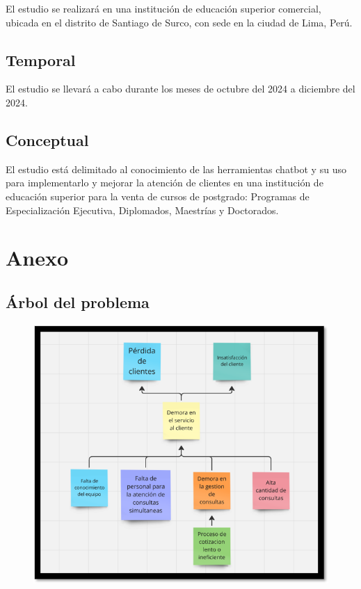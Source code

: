 \documentclass[10pt,a4paper]{article}
\begin{document}
	El estudio se realizará en una institución de educación superior comercial, ubicada en el distrito de Santiago de Surco, con sede en la ciudad de Lima, Perú.

 

    \subsection{Temporal}
	El estudio se llevará a cabo durante los meses de octubre del 2024 a diciembre del 2024.

  

    \subsection{Conceptual}
	El estudio está delimitado al conocimiento de las herramientas chatbot y su uso para implementarlo y mejorar la atención de clientes en una institución de educación superior para la venta de cursos de postgrado: Programas de Especialización Ejecutiva, Diplomados, Maestrías y Doctorados. 

	\section{Anexo}
		    
	\subsection{Árbol del problema}

	\begin{figure}[H]
		\includegraphics[scale=1]{ArbolProblema.png} \hfill 
	\end{figure}
 
\end{document}
